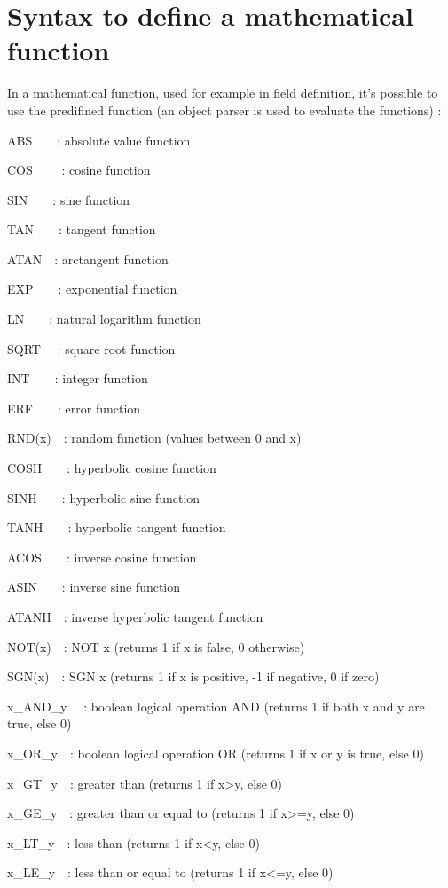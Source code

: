 \section{Syntax to define a mathematical function\label{parser}}
In a mathematical function,
used for example in field definition, it's possible to use the predifined function (an object parser is used to
evaluate the functions) :

ABS\ \ \ \ : absolute value function

COS \ \ \ \ : cosine function

SIN\ \ \ \ : sine function

TAN\ \ \ \ : tangent function

ATAN\ \ : arctangent function

EXP\ \ \ \ : exponential function

LN\ \ \ \ : natural logarithm function

SQRT \ \ : square root function

INT\ \ \ \ : integer function

ERF\ \ \ \ : error function

RND(x)\ \ : random function (values between 0 and x)

COSH\ \ \ \ : hyperbolic cosine function

SINH\ \ \ \ : hyperbolic sine function

TANH\ \ \ \ : hyperbolic tangent function

ACOS\ \ \ \ : inverse cosine function

ASIN\ \ \ \ : inverse sine function

ATANH\ \ : inverse hyperbolic tangent function

NOT(x)\ \ : NOT x (returns 1 if x is false, 0 otherwise) 

SGN(x)\ \ : SGN x (returns 1 if x is positive, -1 if negative, 0 if zero) 

x\_AND\_y \ \ : boolean logical operation AND (returns 1 if both x and y are true, else 0)

x\_OR\_y\ \ : boolean logical operation OR (returns 1 if x or y is true, else 0)

x\_GT\_y\ \ : greater than (returns 1 if x{\textgreater}y, else 0)

x\_GE\_y\ \ : greater than or equal to (returns 1 if x{\textgreater}=y, else 0)

x\_LT\_y\ \ : less than (returns 1 if x{\textless}y, else 0)

x\_LE\_y\ \ : less than or equal to (returns 1 if x{\textless}=y, else 0)

